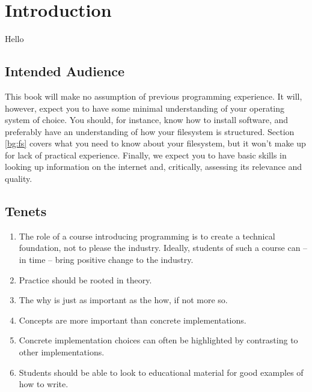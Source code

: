 \chapter{Introduction}
\label{sec:intro}

Hello





\section{Intended Audience}

This book will make no assumption of previous programming experience. It will, however, expect you to have some minimal understanding of your operating system of choice. You should, for instance, know how to install software, and preferably have an understanding of how your filesystem is structured. Section \ref{bg:fs} covers what you need to know about your filesystem, but it won't make up for lack of practical experience. Finally, we expect you to have basic skills in looking up information on the internet and, critically, assessing its relevance and quality.

\section{Tenets}

\begin{enumerate}
	\item The role of a course introducing programming is to create a technical foundation, not to please the industry. Ideally, students of such a course can -- in time -- bring positive change to the industry.
	\item Practice should be rooted in theory.
	\item The why is just as important as the how, if not more so.
	\item Concepts are more important than concrete implementations.
	\item Concrete implementation choices can often be highlighted by contrasting to other implementations.
	\item Students should be able to look to educational material for good examples of how to write.
\end{enumerate}

